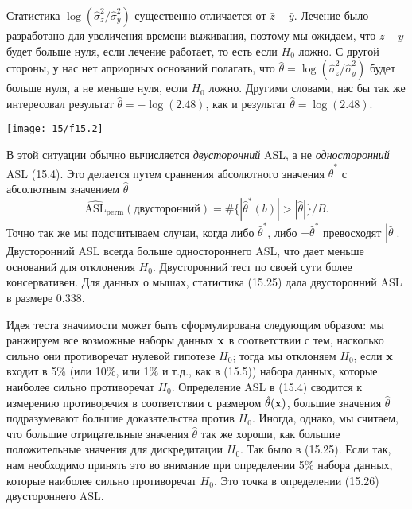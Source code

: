 Статистика $\log (\hat{\sigma}^2_z/\hat{\sigma}^2_y)$ существенно отличается от $\bar{z} - \bar{y}$. Лечение было разработано для увеличения времени выживания, поэтому мы ожидаем, что $\bar{z} - \bar{y}$ будет больше нуля, если лечение работает, то есть если $H_0$ ложно. С другой стороны, у нас нет априорных оснований полагать, что $\hat{\theta} = \log (\hat{\sigma}^2_z/\hat{\sigma}^2_y)$ будет больше нуля, а не меньше нуля, если $H_0$ ложно. Другими словами, нас бы так же интересовал результат $\hat{\theta} = -\log(2.48)$, как и результат $\hat{\theta} = \log(2.48)$.

\noindent
\noindent\texttt{[image: 15/f15.2]}
\newline

В этой ситуации обычно вычисляется \textit{двусторонний} ASL, а не \textit{односторонний} ASL (15.4). Это делается путем сравнения абсолютного значения $\hat{\theta}^*$ с абсолютным значением $\hat{\theta}$
\begin{equation}
	\widehat{\text{ASL}}_{\text{perm}}(\text{двусторонний}) = \# \{ |\hat{\theta}^*(b)| > |\hat{\theta}| \}/B.
\end{equation}
Точно так же мы подсчитываем случаи, когда либо $\hat{\theta}^*$, либо $-\hat{\theta}^*$ превосходят $|\hat{\theta}|$. Двусторонний ASL всегда больше одностороннего ASL, что дает меньше оснований для отклонения $H_0$. Двусторонний тест по своей сути более консервативен. Для данных о мышах, статистика (15.25) дала двусторонний ASL в размере 0.338.

Идея теста значимости может быть сформулирована следующим образом: мы ранжируем все возможные наборы данных $\bf{x}$ в соответствии с тем, насколько сильно они противоречат нулевой гипотезе $H_0$; тогда мы отклоняем $H_0$, если $\bf{x}$ входит в 5\% (или 10\%, или 1\% и т.д., как в (15.5)) набора данных, которые наиболее сильно противоречат $H_0$. Определение ASL в (15.4) сводится к измерению противоречия в соответствии с размером $\hat{\theta}(\bf{x})$, большие значения $\hat{\theta}$ подразумевают большие доказательства против $H_0$. Иногда, однако, мы считаем, что большие отрицательные значения $\hat{\theta}$ так же хороши, как большие положительные значения для дискредитации $H_0$. Так было в (15.25). Если так, нам необходимо принять это во внимание при определении 5\% набора данных, которые наиболее сильно противоречат $H_0$. Это точка в определении (15.26) двустороннего ASL.

